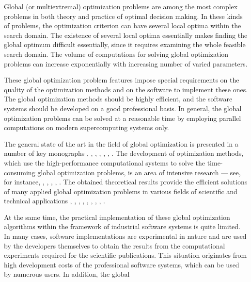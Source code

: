 \documentclass{aims}
\theoremstyle{definition}
\begin{document}
Global (or multiextremal) optimization problems are among the most complex problems
in both theory and practice of optimal decision making. In these kinds of problems,
the optimization criterion can have several local optima within the search domain. 
The existence of several local optima essentially makes
finding the global optimum difficult essentially, since it requires examining the whole feasible
search domain. The volume of computations for solving global optimization problems
can increase exponentially with increasing number of varied parameters.
\par
These global optimization problem features impose special requirements on the quality
of the optimization methods and on the software to implement these ones. The global
optimization methods should be highly efficient, and the software systems should be developed on
a good professional basis. In general, the global optimization problems can be solved at
a reasonable time by employing parallel computations on modern supercomputing systems only.
\par
The general state of the art in the field of global optimization is presented in a
number of key monographs  \cite{floudasPardGO}, \cite{horstTuyGO}, \cite{locatelliSchoenGO}, \cite{pinterGO}, \cite{strSergGO}, \cite{zilinskTornGO}, \cite{zhigljavskyRandGO}.
The development of optimization methods, which use the high-performance computational
systems to solve the time-consuming global optimization problems, is an area of
intensive research --- see, for instance, \cite{censorZeniosParGO}, \cite{ciegisHentyParGO},
\cite{luqueAlbaGA}, \cite{stronginGergelBarkalovParGO}, \cite{strSergGO}. The obtained
theoretical results provide the efficient solutions of many applied global
optimization problems in various fields of scientific and technical applications \cite{Famularo1999}, \cite{fasanoPinter2013},
\cite{floudasPardalosGOState}, \cite{Kvasov2015}, \cite{Menniti}, \cite{locatelliSchoenGO},
\cite{luqueAlbaGA}, \cite{pardalosZhigljavskyZilinskas2016}, \cite{pinterGO}.
\par
At the same time, the practical implementation of these global optimization algorithms
within the framework of industrial software systems is quite limited. In many cases,
software implementations are experimental in nature and are used by the developers
themselves to obtain the results from the computational experiments required for the
scientific publications. This situation originates from high development costs of the
professional software systems, which can be used by numerous users. In addition, the global
\end{document}
